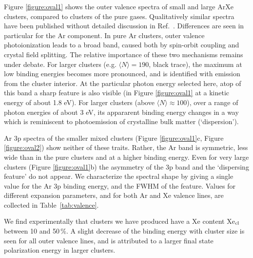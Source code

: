 Figure \ref{figure:oval1} shows the outer valence spectra of small and large ArXe clusters, compared to clusters of the pure gases. 
Qualitatively similar spectra have been published without detailed discussion in Ref.\ \cite{lindblad}.
Differences are seen in particular for the Ar component. 
In pure Ar clusters, outer valence photoionization leads to a broad band, caused both by spin-orbit coupling and crystal field splitting. 
The relative importance of these two mechanisms remains under debate.\cite{hergenhahnprb,rolles,foerstel_arg1_2010} 
For larger clusters (e.g. $\langle N\rangle = 190$, black trace), the maximum at low binding energies becomes more pronounced, and is identified with emission from the cluster interior.\cite{hergenhahnprb,rolles}
At the particular photon energy selected here, atop of this band a sharp feature is also visible (in Figure \ref{figure:oval1} at a kinetic energy of about 1.8 eV).
For larger clusters (above $\langle N\rangle \approx 100$), over a range of photon energies of about 3 eV, its appararent binding energy changes in a way which is reminiscent to photoemission of crystalline bulk matter (`dispersion').\cite{foerstel_arg1_2010,foerstel_arg2_2011} 

Ar 3p spectra of the smaller mixed clusters (Figure \ref{figure:oval1}c, Figure \ref{figure:oval2}) show neither of these traits.
Rather, the Ar band is symmetric, less wide than in the pure clusters and at a higher binding energy.
Even for very large clusters (Figure \ref{figure:oval1}b) the asymmetry of the 3p band and the `dispersing feature' do not appear.
We characterize the spectral shape by giving a single value for the Ar 3p binding energy, and the FWHM of the feature.
Values for different expansion parameters, and for both Ar and Xe valence lines, are collected in Table\ \ref{tab:valence}.

We find experimentally that clusters we have produced have a Xe content Xe$_{\rm cl}$ between 10 and 50\,\%.
A slight decrease of the binding energy with cluster size is seen for all outer valence lines, and is attributed to a larger final state polarization energy in larger clusters. 

